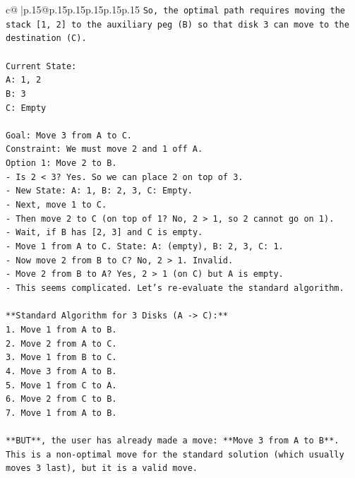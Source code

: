 \documentclass{article}
\begin{document}
{\begin{supertabular}{c@{$\;$}|p{.15\linewidth}@{}p{.15\linewidth}p{.15\linewidth}p{.15\linewidth}p{.15\linewidth}p{.15\linewidth}}
{{{\texttt{So, the optimal path requires moving the stack {[}1, 2{]} to the auxiliary peg (B) so that disk 3 can move to the destination (C).} \\
\\ 
\texttt{Current State:} \\
\texttt{A: 1, 2} \\
\texttt{B: 3} \\
\texttt{C: Empty} \\
\\ 
\texttt{Goal: Move 3 from A to C.} \\
\texttt{Constraint: We must move 2 and 1 off A.} \\
\texttt{Option 1: Move 2 to B.} \\
\texttt{{-} Is 2 < 3? Yes. So we can place 2 on top of 3.} \\
\texttt{{-} New State: A: 1, B: 2, 3, C: Empty.} \\
\texttt{{-} Next, move 1 to C.} \\
\texttt{{-} Then move 2 to C (on top of 1? No, 2 > 1, so 2 cannot go on 1).} \\
\texttt{{-} Wait, if B has {[}2, 3{]} and C is empty.} \\
\texttt{{-} Move 1 from A to C. State: A: (empty), B: 2, 3, C: 1.} \\
\texttt{{-} Now move 2 from B to C? No, 2 > 1. Invalid.} \\
\texttt{{-} Move 2 from B to A? Yes, 2 > 1 (on C) but A is empty.} \\
\texttt{{-} This seems complicated. Let's re{-}evaluate the standard algorithm.} \\
\\ 
\texttt{**Standard Algorithm for 3 Disks (A {-}> C):**} \\
\texttt{1. Move 1 from A to B.} \\
\texttt{2. Move 2 from A to C.} \\
\texttt{3. Move 1 from B to C.} \\
\texttt{4. Move 3 from A to B.} \\
\texttt{5. Move 1 from C to A.} \\
\texttt{6. Move 2 from C to B.} \\
\texttt{7. Move 1 from A to B.} \\
\\ 
\texttt{**BUT**, the user has already made a move: **Move 3 from A to B**.} \\
\texttt{This is a non{-}optimal move for the standard solution (which usually moves 3 last), but it is a valid move.} \\
}}}
\end{supertabular}}
\end{document}

